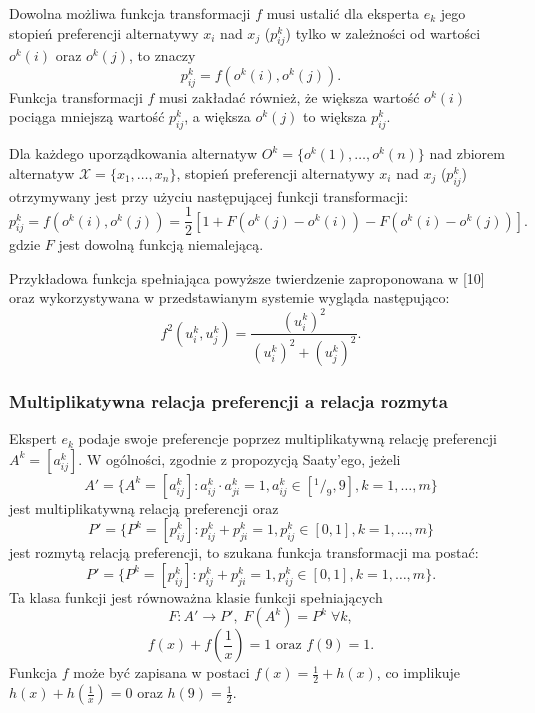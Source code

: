 Dowolna możliwa funkcja transformacji $f$ musi ustalić dla eksperta $e_k$ jego
stopień preferencji alternatywy $x_i$ nad $x_j$ ($p^k_{ij}$) tylko w zależności
od wartości $o^k(i)$ oraz $o^k(j)$, to znaczy
\begin{equation}
p^k_{ij} = f(o^k(i), o^k(j)).
\end{equation}
Funkcja transformacji $f$ musi zakładać również, że większa wartość $o^k(i)$
pociąga mniejszą wartość $p^k_{ij}$, a większa $o^k(j)$ to większa $p^k_{ij}$.

\begin{theorem}
Dla każdego uporządkowania alternatyw $O^k = \{o^k(1), \dotsc, o^k(n)\}$ nad
zbiorem alternatyw $\mathcal{X} = \{x_1,\dotsc,x_n\}$, stopień preferencji
alternatywy $x_i$ nad $x_j$ ($p^k_{ij}$) otrzymywany jest przy użyciu
następującej funkcji transformacji:
\begin{equation}
p^k_{ij} = f(o^k(i),o^k(j)) = \frac{1}{2} [1 + F(o^k(j) - o^k(i)) - F(o^k(i) -
o^k(j))].
\end{equation}
gdzie $F$ jest dowolną funkcją niemalejącą.
\end{theorem}

Przykładowa funkcja spełniająca powyższe twierdzenie zaproponowana w [10] oraz
wykorzystywana w przedstawianym systemie wygląda następująco:
\begin{equation}
f^2(u^k_i,u^k_j) = \frac{(u^k_i)^2}{(u^k_i)^2 + (u^k_j)^2}.
\end{equation}

\subsubsection{Multiplikatywna relacja preferencji a relacja rozmyta}
Ekspert $e_k$ podaje swoje preferencje poprzez multiplikatywną relację
preferencji $A^k = [a^k_{ij}]$. W ogólności, zgodnie z propozycją Saaty'ego,
jeżeli
$$A' = \{ A^k = [a^k_{ij}] : a^k_{ij} \cdot a^k_{ji} = 1, a^k_{ij} \in
[^1/_9,9], k= 1, \dotsc, m \}$$ 
jest multiplikatywną relacją preferencji oraz
$$P' = \{ P^k = [p^k_{ij}] : p^k_{ij} + p^k_{ji} = 1, p^k_{ij} \in
[0,1], k= 1, \dotsc, m \}$$
jest rozmytą relacją preferencji, to szukana funkcja transformacji ma postać:
$$P' = \{ P^k = [p^k_{ij}] : p^k_{ij} + p^k_{ji} = 1, p^k_{ij} \in
[0,1], k= 1, \dotsc, m \}.$$ 
Ta klasa funkcji jest równoważna klasie funkcji spełniających
$$F : A' \rightarrow P',\; F(A^k) = P^k \; \forall k,$$
$$ f(x)+f(\frac{1}{x})=1 \text{ oraz } f(9)=1.$$
Funkcja $f$ może być zapisana w postaci $f(x) = \frac{1}{2} + h(x)$, co
implikuje $h(x) + h(\frac{1}{x}) = 0 $ oraz $h(9) = \frac{1}{2}.$

